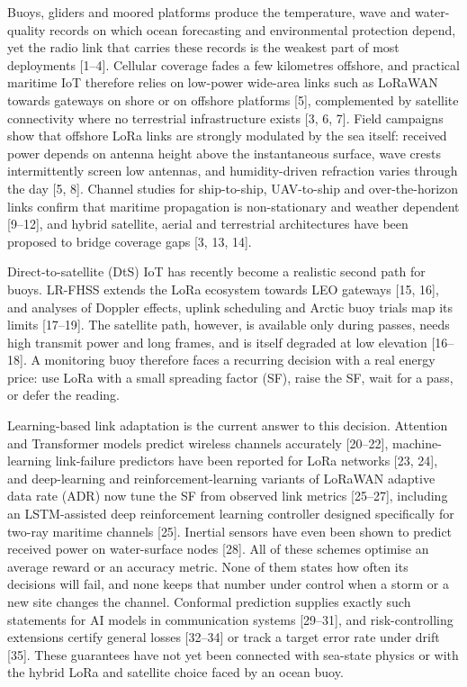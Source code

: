 \documentclass[
  11pt,
]{article}
\begin{document}
Buoys, gliders and moored platforms produce the temperature, wave and
water-quality records on which ocean forecasting and environmental
protection depend, yet the radio link that carries these records is the
weakest part of most deployments {[}1--4{]}. Cellular coverage fades a
few kilometres offshore, and practical maritime IoT therefore relies on
low-power wide-area links such as LoRaWAN towards gateways on shore or
on offshore platforms {[}5{]}, complemented by satellite connectivity
where no terrestrial infrastructure exists {[}3, 6, 7{]}. Field
campaigns show that offshore LoRa links are strongly modulated by the
sea itself: received power depends on antenna height above the
instantaneous surface, wave crests intermittently screen low antennas,
and humidity-driven refraction varies through the day {[}5, 8{]}.
Channel studies for ship-to-ship, UAV-to-ship and over-the-horizon links
confirm that maritime propagation is non-stationary and weather
dependent {[}9--12{]}, and hybrid satellite, aerial and terrestrial
architectures have been proposed to bridge coverage gaps {[}3, 13,
14{]}.

Direct-to-satellite (DtS) IoT has recently become a realistic second
path for buoys. LR-FHSS extends the LoRa ecosystem towards LEO gateways
{[}15, 16{]}, and analyses of Doppler effects, uplink scheduling and
Arctic buoy trials map its limits {[}17--19{]}. The satellite path,
however, is available only during passes, needs high transmit power and
long frames, and is itself degraded at low elevation {[}16--18{]}. A
monitoring buoy therefore faces a recurring decision with a real energy
price: use LoRa with a small spreading factor (SF), raise the SF, wait
for a pass, or defer the reading.

Learning-based link adaptation is the current answer to this decision.
Attention and Transformer models predict wireless channels accurately
{[}20--22{]}, machine-learning link-failure predictors have been
reported for LoRa networks {[}23, 24{]}, and deep-learning and
reinforcement-learning variants of LoRaWAN adaptive data rate (ADR) now
tune the SF from observed link metrics {[}25--27{]}, including an
LSTM-assisted deep reinforcement learning controller designed
specifically for two-ray maritime channels {[}25{]}. Inertial sensors
have even been shown to predict received power on water-surface nodes
{[}28{]}. All of these schemes optimise an average reward or an accuracy
metric. None of them states how often its decisions will fail, and none
keeps that number under control when a storm or a new site changes the
channel. Conformal prediction supplies exactly such statements for AI
models in communication systems {[}29--31{]}, and risk-controlling
extensions certify general losses {[}32--34{]} or track a target error
rate under drift {[}35{]}. These guarantees have not yet been connected
with sea-state physics or with the hybrid LoRa and satellite choice
faced by an ocean buoy.
\end{document}
